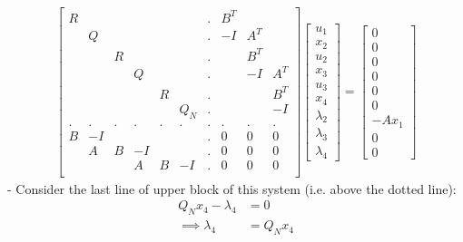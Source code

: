 \newcommand\aug{\fboxsep=-\fboxrule\!\!\!\fbox{\strut}\!\!\!}
\begin{align}
    \begin{bmatrix}
        R   & \     & \     & \     & \     &       & . & B^T &  &  \\
        \   & Q     & \     & \     & \     &       & . & -I & A^T &  \\
        \   & \     & R     & \     & \     &       & . & & B^T & \\
        \   & \     & \     & Q     & \     &       & . & & -I    & A^T \\
        \   & \     & \     & \     & R     &       & . & &   & B^T \\
        \   & \     & \     & \     & \     & Q_N   & . &   &  & -I \\
        .   & .     & .     & .     & .     & . & . &  .    &  .   & . \\
        B   & -I     & \     & \     & \     & \   & . &  0 & 0 & 0 \\
        \   & A     & B     & -I     & \     & \   & . &  0 & 0 & 0 \\
        \   & \     & \     & A     & B     & -I   & . &  0 & 0 & 0 \\
    \end{bmatrix}
    \begin{bmatrix}
        u_1 \\
        x_2 \\
        u_2 \\
        x_3 \\
        u_3 \\
        x_4 \\
        \lambda_2 \\
        \lambda_3 \\
        \lambda_4
    \end{bmatrix}
    =
    \begin{bmatrix}
        0 \\
        0 \\
        0 \\
        0 \\
        0 \\
        0 \\
        -A x_1 \\
        0 \\
        0
    \end{bmatrix}
\end{align}
-
\noindent
Consider the last line of upper block of this system (i.e. above the dotted line):
\begin{align}
Q_N x_4 - \lambda_4 &= 0 \\
\implies \lambda_4 &= Q_N x_4
\end{align}

